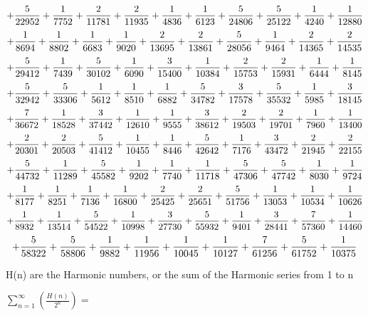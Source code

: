 \documentclass{article}
\begin{document}
$$+  {5\over 22952}  +  {1\over 7752}  +  {2\over 11781}  +  {2\over 11935}  +  {1\over 4836}  +  {1\over 6123}  +  {5\over 24806}  +  {5\over 25122}  +  {1\over 4240}  +  {1\over 12880}  $$
$$+  {1\over 8694}  +  {1\over 8802}  +  {1\over 6683}  +  {1\over 9020}  +  {2\over 13695}  +  {2\over 13861}  +  {5\over 28056}  +  {1\over 9464}  +  {2\over 14365}  +  {2\over 14535}  $$
$$+  {5\over 29412}  +  {1\over 7439}  +  {5\over 30102}  +  {1\over 6090}  +  {3\over 15400}  +  {1\over 10384}  +  {2\over 15753}  +  {2\over 15931}  +  {1\over 6444}  +  {1\over 8145}  $$
$$+  {5\over 32942}  +  {5\over 33306}  +  {1\over 5612}  +  {1\over 8510}  +  {1\over 6882}  +  {5\over 34782}  +  {3\over 17578}  +  {5\over 35532}  +  {1\over 5985}  +  {3\over 18145}  $$
$$+  {7\over 36672}  +  {1\over 18528}  +  {3\over 37442}  +  {1\over 12610}  +  {1\over 9555}  +  {3\over 38612}  +  {2\over 19503}  +  {2\over 19701}  +  {1\over 7960}  +  {1\over 13400}  $$
$$+  {2\over 20301}  +  {2\over 20503}  +  {5\over 41412}  +  {1\over 10455}  +  {1\over 8446}  +  {5\over 42642}  +  {1\over 7176}  +  {3\over 43472}  +  {2\over 21945}  +  {2\over 22155}  $$
$$+  {5\over 44732}  +  {1\over 11289}  +  {5\over 45582}  +  {1\over 9202}  +  {1\over 7740}  +  {1\over 11718}  +  {5\over 47306}  +  {5\over 47742}  +  {1\over 8030}  +  {1\over 9724}  $$
$$+  {1\over 8177}  +  {1\over 8251}  +  {1\over 7136}  +  {1\over 16800}  +  {2\over 25425}  +  {2\over 25651}  +  {5\over 51756}  +  {1\over 13053}  +  {1\over 10534}  +  {1\over 10626}  $$
$$+  {1\over 8932}  +  {1\over 13514}  +  {5\over 54522}  +  {1\over 10998}  +  {3\over 27730}  +  {5\over 55932}  +  {1\over 9401}  +  {3\over 28441}  +  {7\over 57360}  +  {1\over 14460}  $$
$$+  {5\over 58322}  +  {5\over 58806}  +  {1\over 9882}  +  {1\over 11956}  +  {1\over 10045}  +  {1\over 10127}  +  {7\over 61256}  +  {5\over 61752}  +  {1\over 10375}  $$

\bigskip
H(n) are the Harmonic numbers, or the sum of the Harmonic series from 1 to n

\bigskip
$\sum_{n=1}^\infty \left( \frac{H(n)}{2^n} \right)=$
\end{document}

